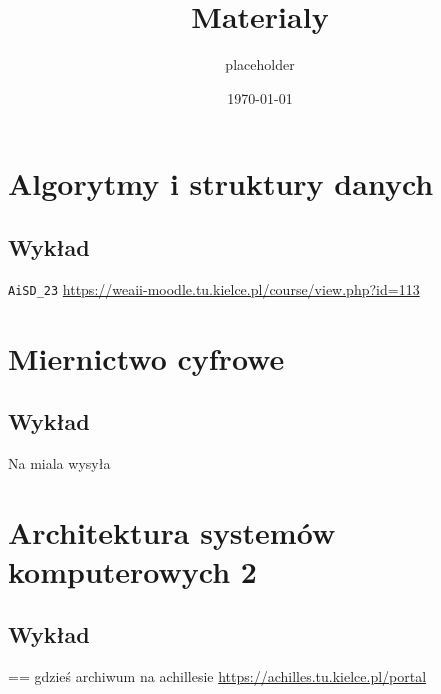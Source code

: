 \documentclass[11pt]{article}
\author{placeholder}
\date{\today}
\title{Materialy}
\begin{document}
\maketitle
\tableofcontents

\section{Algorytmy i struktury danych}
\label{sec:org325862b}
\subsection{Wykład}
\label{sec:org45b7c8f}
\texttt{AiSD\_23}
\url{https://weaii-moodle.tu.kielce.pl/course/view.php?id=113}
\section{Miernictwo cyfrowe}
\label{sec:org1b256c5}
\subsection{Wykład}
\label{sec:org9c4bba5}
Na miala wysyła
\section{Architektura systemów komputerowych 2}
\label{sec:orgd8425bc}
\subsection{Wykład}
\label{sec:org7add293}
== gdzieś archiwum na achillesie \url{https://achilles.tu.kielce.pl/portal}
\end{document}
